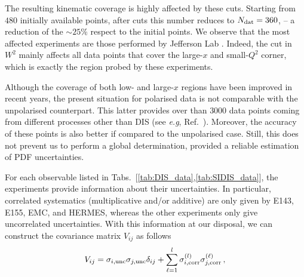 The resulting kinematic coverage is highly affected by these cuts. Starting from $480$ initially available points, after cuts this number reduces to $N_{\textrm{dat}}=360$,  -- a reduction of the $\sim 25\%$ respect to the initial points. We observe that the most affected experiments are those performed by Jefferson Lab \cite{Kramer:2002tt, JeffersonLabHallA:2004tea, CLAS:2014qtg}. Indeed, the cut in $W^2$ mainly affects all data points that cover the large-$x$ and small-$Q^2$ corner, which is exactly the region probed by these experiments.\par
Although the coverage of both low- and large-$x$ regions have been improved in recent years, the present situation for polarised data is not comparable with the unpolarised counterpart. This latter provides over than $3000$ data points coming from different processes other than DIS (see \textit{e.g}, Ref.~\cite{Kassabov:2022pps}). Moreover, the accuracy of these points is also better if compared to the unpolarised case. Still, this does not prevent us to perform a global determination, provided a reliable estimation of PDF uncertainties.\par
For each observable listed in Tabs.~[\ref{tab:DIS_data},\ref{tab:SIDIS_data}], the experiments provide information about their uncertainties.
In particular, correlated systematics (multiplicative and/or additive) are only given by E143, E155, EMC, and HERMES, whereas the other experiments only give uncorrelated uncertainties. With this information at our disposal, we can construct the covariance matrix $V_{ij}$ as follows
\begin{equation}
  V_{ij} =  \sigma_{i,\textrm{unc}} \sigma_{j,\textrm{unc}} \delta_{ij} + \sum_{\ell=1}^{l} \sigma_{i,\textrm{corr}}^{(l)} \sigma_{j,\textrm{corr}}^{(\ell)} \,,
\end{equation}
